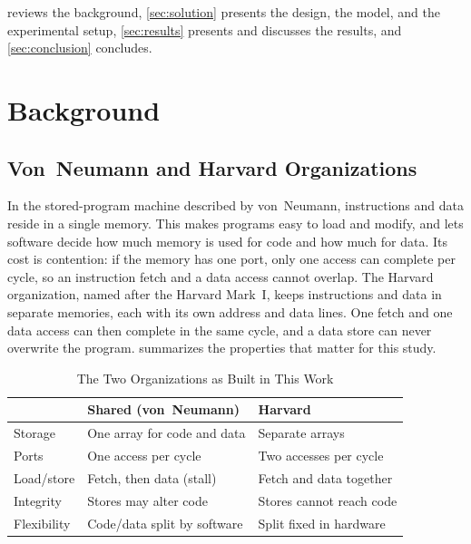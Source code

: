 \documentclass[conference]{IEEEtran}
\begin{document}
 reviews the background, \cref{sec:solution} presents the design, the model,
and the experimental setup, \cref{sec:results} presents and discusses the results, and
\cref{sec:conclusion} concludes.

\section{Background}
\label{sec:background}

\subsection{Von~Neumann and Harvard Organizations}
In the stored-program machine described by von~Neumann, instructions and data reside in a single
memory. This makes programs easy to load and modify, and lets software decide how much memory is
used for code and how much for data. Its cost is contention: if the memory has one port, only one
access can complete per cycle, so an instruction fetch and a data access cannot overlap. The
Harvard organization, named after the Harvard Mark~I, keeps instructions and data in separate
memories, each with its own address and data lines. One fetch and one data access can then
complete in the same cycle, and a data store can never overwrite the program. 
summarizes the properties that matter for this study.

\begin{table}[t]
\centering
\caption{The Two Organizations as Built in This Work}
\label{tab:orgs}
\footnotesize
\begin{tabularx}{\columnwidth}{@{}l X X@{}}
\toprule
 & \textbf{Shared (von~Neumann)} & \textbf{Harvard} \\
\midrule
Storage & One array for code and data & Separate arrays \\
Ports & One access per cycle & Two accesses per cycle \\
Load/store & Fetch, then data (stall) & Fetch and data together \\
Integrity & Stores may alter code & Stores cannot reach code \\
Flexibility & Code/data split by software & Split fixed in hardware \\
\bottomrule
\end{tabularx}
\end{table}
\end{document}
